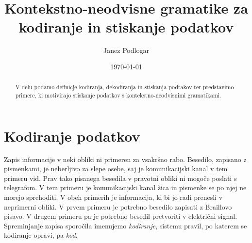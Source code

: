 \documentclass{amsart}
\title{Kontekstno-neodvisne gramatike za kodiranje in stiskanje podatkov}
\author{Janez Podlogar}
\date{\today}
\theoremstyle{definition} %
\theoremstyle{plain} %
\begin{document}
\begin{abstract}

    V delu podamo definicje kodiranja, dekodiranja in stiskanja podtakov ter predstavimo
    primere, ki motivirajo stiskanje podatkov s kontekstno-neodvisnimi gramatikami.

\end{abstract}

\maketitle

\section{Kodiranje podatkov}

Zapis informacije v neki obliki ni primeren za vsakršno rabo. Besedilo, zapisano z 
pismenkami, je neberljivo za slepe osebe, saj je komunikacijski kanal v tem primeru
vid. Prav tako pisanega besedila v pravotni obliki ni mogoče poslati s telegrafom. V tem
primeru je komunikacijski kanal žica in pismenke se po njej ne morejo sprehoditi. V obeh 
primerih je informacija, ki bi jo radi prenesli v neprimerni obliki. V prvem 
primeru je potrebno besedilo zapisati z Braillovo pisavo. V drugem primeru pa je
potrebno besedil pretvoriti v električni signal. Spreminjanje zapisa sporočila
imenujemo \textit{kodiranje}, sistemu pravil, po katerem se kodiranje opravi,
pa \textit{kod}. 
\end{document}
